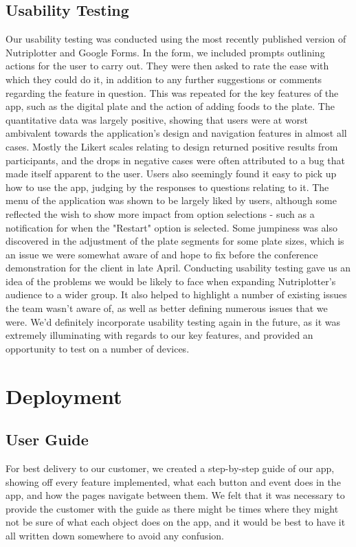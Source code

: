\documentclass{l3proj}
\begin{document}
\subsection{Usability Testing}
\label{subsec:usability testing}
Our usability testing was conducted using the most recently published version of Nutriplotter and Google Forms. In the form, we included prompts outlining actions for the user to carry out. They were then asked to rate the ease with which they could do it, in addition to any further suggestions or comments regarding the feature in question. This was repeated for the key features of the app, such as the digital plate and the action of adding foods to the plate. The quantitative data was largely positive, showing that users were at worst ambivalent towards the application's design and navigation features in almost all cases. Mostly the Likert scales relating to design returned positive results from participants, and the drops in negative cases were often attributed to a bug that made itself apparent to the user. Users also seemingly found it easy to pick up how to use the app, judging by the responses to questions relating to it. The menu of the application was shown to be largely liked by users, although some reflected the wish to show more impact from option selections - such as a notification for when the "Restart" option is selected. Some jumpiness was also discovered in the adjustment of the plate segments for some plate sizes, which is an issue we were somewhat aware of and hope to fix before the conference demonstration for the client in late April. Conducting usability testing gave us an idea of the problems we would be likely to face when expanding Nutriplotter's audience to a wider group. It also helped to highlight a number of existing issues the team wasn't aware of, as well as better defining numerous issues that we were. We'd definitely incorporate usability testing again in the future, as it was extremely illuminating with regards to our key features, and provided an opportunity to test on a number of devices.\par
\section{Deployment}
\label{sec: deployment}
\subsection{User Guide}
\label{subsec: user guide}
For best delivery to our customer, we created a step-by-step guide of our app, showing off every feature implemented, what each button and event does in the app, and how the pages navigate between them. We felt that it was necessary to provide the customer with the guide as there might be times where they might not be sure of what each object does on the app, and it would be best to have it all written down somewhere to avoid any confusion.\par
\end{document}
